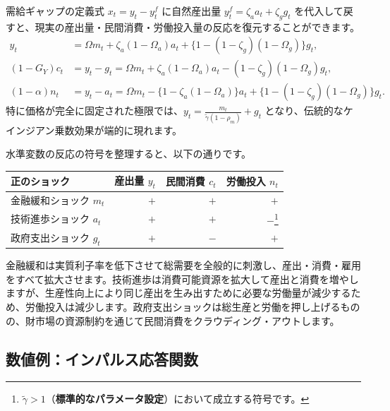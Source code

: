 \documentclass[
  japanese,
  lualatex,
  ja=standard,
  12pt,
  a4paper]{ltjsarticle}
\newcounter{none} %
\begin{document}
\Needspace{0.40\textheight}

需給ギャップの定義式 \(x_t = y_t - y_t^f\) に自然産出量
\(y_t^f = \zeta_a a_t + \zeta_g g_t\)
を代入して戻すと、現実の産出量・民間消費・労働投入量の反応を復元することができます。
\[
\begin{aligned}
y_t
&=
\Omega m_t
+\zeta_a(1-\Omega_a)a_t
+\{1-(1-\zeta_g)(1-\Omega_g)\}g_t,\\
(1-G_Y)c_t
&=
y_t-g_t
=
\Omega m_t
+\zeta_a(1-\Omega_a)a_t
-(1-\zeta_g)(1-\Omega_g)g_t,\\
(1-\alpha)n_t
&=
y_t-a_t
=
\Omega m_t
-\{1-\zeta_a(1-\Omega_a)\}a_t
+\{1-(1-\zeta_g)(1-\Omega_g)\}g_t.
\end{aligned}
\]
特に価格が完全に固定された極限では、\(y_t = \frac{m_t}{\tilde{\gamma}(1-\rho_m)} + g_t\)
となり、伝統的なケインジアン乗数効果が端的に現れます。

\Needspace{0.28\textheight}

水準変数の反応の符号を整理すると、以下の通りです。

{\def\LTcaptype{none} %
\begin{longtable}[]{@{}lrrr@{}}
\toprule\noalign{}
正のショック & 産出量 \(y_t\) & 民間消費 \(c_t\) & 労働投入 \(n_t\) \\
\midrule\noalign{}
\endhead
\bottomrule\noalign{}
\endlastfoot
金融緩和ショック \(m_t\) & \(+\) & \(+\) & \(+\) \\
技術進歩ショック \(a_t\) & \(+\) & \(+\) & \(-\)\footnote{\(\tilde{\gamma}>1\)（\textbf{標準的なパラメータ設定}）において成立する符号です。} \\
政府支出ショック \(g_t\) & \(+\) & \(-\) & \(+\) \\
\end{longtable}
}

金融緩和は実質利子率を低下させて総需要を全般的に刺激し、産出・消費・雇用をすべて拡大させます。技術進歩は消費可能資源を拡大して産出と消費を増やしますが、生産性向上により同じ産出を生み出すために必要な労働量が減少するため、労働投入は減少します。政府支出ショックは総生産と労働を押し上げるものの、財市場の資源制約を通じて民間消費をクラウディング・アウトします。

\Needspace{0.30\textheight}

\subsection{数値例：インパルス応答関数}\label{ux6570ux5024ux4f8bux30a4ux30f3ux30d1ux30ebux30b9ux5fdcux7b54ux95a2ux6570}
\end{document}

